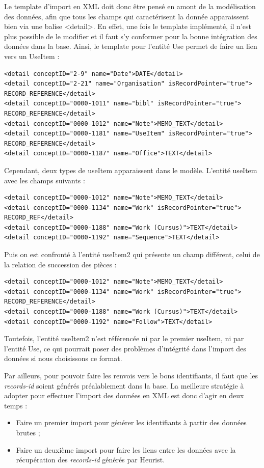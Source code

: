\documentclass[a4paper,12pt,twoside]{book}
\begin{document}
	Le template d'import en XML doit donc être pensé en amont de la modélisation des données, afin que tous les champs qui caractérisent la donnée apparaissent bien via une balise \textless detail\textgreater . En effet, une fois le template implémenté, il n'est plus possible de le modifier et il faut s'y conformer pour la bonne intégration des données dans la base. Ainsi, le template pour l'entité Use permet de faire un lien vers un UseItem :
	\begin{verbatim}
<detail conceptID="2-9" name="Date">DATE</detail>
<detail conceptID="2-21" name="Organisation" isRecordPointer="true">
RECORD_REFERENCE</detail>
<detail conceptID="0000-1011" name="bibl" isRecordPointer="true">
RECORD_REFERENCE</detail>
<detail conceptID="0000-1012" name="Note">MEMO_TEXT</detail>
<detail conceptID="0000-1181" name="UseItem" isRecordPointer="true">
RECORD_REFERENCE</detail>
<detail conceptID="0000-1187" name="Office">TEXT</detail>
	\end{verbatim}
	
Cependant, deux types de useItem apparaissent dans le modèle. L'entité useItem avec les champs suivants :
	\begin{verbatim}
<detail conceptID="0000-1012" name="Note">MEMO_TEXT</detail>
<detail conceptID="0000-1134" name="Work" isRecordPointer="true">
RECORD_REF</detail>
<detail conceptID="0000-1188" name="Work (Cursus)">TEXT</detail>
<detail conceptID="0000-1192" name="Sequence">TEXT</detail>
	\end{verbatim}
Puis on est confronté à l'entité useItem2 qui présente un champ différent, celui de la relation de succession des pièces :
\begin{verbatim}
<detail conceptID="0000-1012" name="Note">MEMO_TEXT</detail>
<detail conceptID="0000-1134" name="Work" isRecordPointer="true">
RECORD_REFERENCE</detail>
<detail conceptID="0000-1188" name="Work (Cursus)">TEXT</detail>
<detail conceptID="0000-1192" name="Follow">TEXT</detail>
\end{verbatim}
Toutefois, l'entité useItem2 n'est référencée ni par le premier useItem, ni par l'entité Use, ce qui pourrait poser des problèmes d'intégrité dans l'import des données si nous choisissons ce format.

	Par ailleurs, pour pouvoir faire les renvois vers le bons identifiants, il faut que les \textit{records-id} soient générés préalablement dans la base. La meilleure stratégie à adopter pour effectuer l'import des données en XML est donc d'agir en deux temps :
	\begin{itemize}
	    \item Faire un premier import pour générer les identifiants à partir des données brutes ;
	    \item Faire un deuxième import pour faire les liens entre les données avec la récupération des \textit{records-id} générés par Heurist.
	\end{itemize}
	
\end{document}
